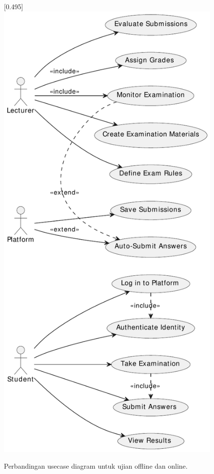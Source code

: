 \begin{figure}[h!]
	\hfill
	[0.495\linewidth]{\includegraphics[width=\linewidth]{../figures/usecase_online_exam}}
	\caption{Perbandingan usecase diagram untuk ujian offline dan online.}
\end{figure}

